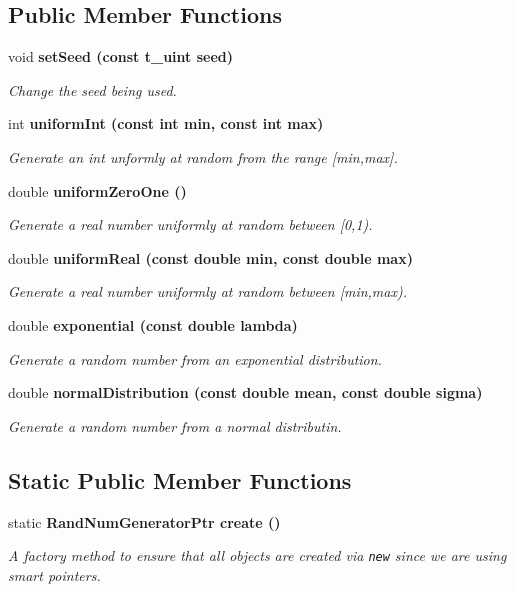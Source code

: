 \subsection*{Public Member Functions}
\begin{CompactItemize}
\item 
void \bf{set\-Seed} (const \bf{t\_\-uint} seed)
\begin{CompactList}\small\item\em Change the seed being used. \item\end{CompactList}\item 
int \bf{uniform\-Int} (const int min, const int max)
\begin{CompactList}\small\item\em Generate an int unformly at random from the range [min,max]. \item\end{CompactList}\item 
double \bf{uniform\-Zero\-One} ()
\begin{CompactList}\small\item\em Generate a real number uniformly at random between [0,1). \item\end{CompactList}\item 
double \bf{uniform\-Real} (const double min, const double max)
\begin{CompactList}\small\item\em Generate a real number uniformly at random between [min,max). \item\end{CompactList}\item 
double \bf{exponential} (const double lambda)
\begin{CompactList}\small\item\em Generate a random number from an exponential distribution. \item\end{CompactList}\item 
double \bf{normal\-Distribution} (const double mean, const double sigma)
\begin{CompactList}\small\item\em Generate a random number from a normal distributin. \item\end{CompactList}\end{CompactItemize}
\subsection*{Static Public Member Functions}
\begin{CompactItemize}
\item 
static \bf{Rand\-Num\-Generator\-Ptr} \bf{create} ()\label{classRandNumGenerator_6f7ea6ab681743da81244ab3815e9be1}

\begin{CompactList}\small\item\em A factory method to ensure that all objects are created via {\tt new} since we are using smart pointers. \item\end{CompactList}\end{CompactItemize}
